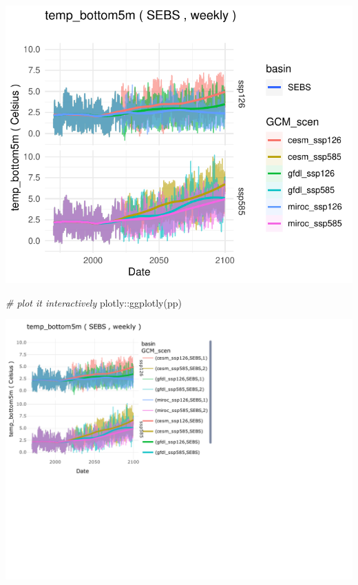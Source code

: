 \documentclass[
]{article}
\newenvironment{Shaded}{\begin{snugshade}}{\end{snugshade}}
\newcommand{\CommentTok}[1]{\textcolor[rgb]{0.56,0.35,0.01}{\textit{#1}}}
\newcommand{\FunctionTok}[1]{\textcolor[rgb]{0.00,0.00,0.00}{#1}}
\newcommand{\NormalTok}[1]{#1}
\newcommand{\SpecialCharTok}[1]{\textcolor[rgb]{0.00,0.00,0.00}{#1}}
\begin{document}
\begin{center}\includegraphics{ACLIM2_quickStart_files/figure-latex/sizespec-2} \end{center}

\begin{Shaded}
\begin{Highlighting}[]
  \CommentTok{\# plot it interactively}
\NormalTok{  plotly}\SpecialCharTok{::}\FunctionTok{ggplotly}\NormalTok{(pp)}
\end{Highlighting}
\end{Shaded}

\begin{center}\includegraphics{ACLIM2_quickStart_files/figure-latex/unnamed-chunk-10-1} \end{center}
\end{document}
